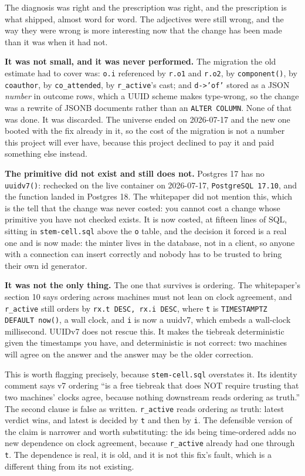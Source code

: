 The diagnosis was right and the prescription was right, and the prescription is what shipped, almost word for word. The adjectives were still wrong, and the way they were wrong is more interesting now that the change has been made than it was when it had not.

\textbf{It was not small, and it was never performed.} The migration the old estimate had to cover was: \texttt{o.i} referenced by \texttt{r.o1} and \texttt{r.o2}, by \texttt{component()}, by \texttt{coauthor}, by \texttt{co\_attended}, by \texttt{r\_active}'s cast; and \texttt{d->'of'} stored as a JSON \emph{number} in \labLineageOutcomes{} outcome rows, which a UUID scheme makes type-wrong, so the change was a rewrite of \labLineageOutcomes{} JSONB documents rather than an \texttt{ALTER COLUMN}. None of that was done. It was discarded. The \labLineageName{} universe ended on 2026-07-17 and the new one booted with the fix already in it, so the cost of the migration is not a number this project will ever have, because this project declined to pay it and paid something else instead.

\textbf{The primitive did not exist and still does not.} Postgres 17 has no \texttt{uuidv7()}: rechecked on the live container on 2026-07-17, \texttt{PostgreSQL 17.10}, and the function landed in Postgres 18. The whitepaper did not mention this, which is the tell that the change was never costed: you cannot cost a change whose primitive you have not checked exists. It is now costed, at fifteen lines of SQL, sitting in \texttt{stem-cell.sql} above the \texttt{o} table, and the decision it forced is a real one and is now made: the minter lives in the database, not in a client, so anyone with a connection can insert correctly and nobody has to be trusted to bring their own id generator.

\textbf{It was not the only thing.} The one that survives is ordering. The whitepaper's section 10 says ordering across machines must not lean on clock agreement, and \texttt{r\_active} still orders by \texttt{rx.t DESC, rx.i DESC}, where \texttt{t} is \texttt{TIMESTAMPTZ DEFAULT now()}, a wall clock, and \texttt{i} is now a uuidv7, which embeds a wall-clock millisecond. UUIDv7 does not rescue this. It makes the tiebreak deterministic given the timestamps you have, and deterministic is not correct: two machines will agree on the answer and the answer may be the older correction.

This is worth flagging precisely, because \texttt{stem-cell.sql} overstates it. Its identity comment says v7 ordering ``is a free tiebreak that does NOT require trusting that two machines' clocks agree, because nothing downstream reads ordering as truth.'' The second clause is false as written. \texttt{r\_active} reads ordering as truth: latest verdict wins, and latest is decided by \texttt{t} and then by \texttt{i}. The defensible version of the claim is narrower and worth substituting: the ids being time-ordered adds no new dependence on clock agreement, because \texttt{r\_active} already had one through \texttt{t}. The dependence is real, it is old, and it is not this fix's fault, which is a different thing from its not existing.

